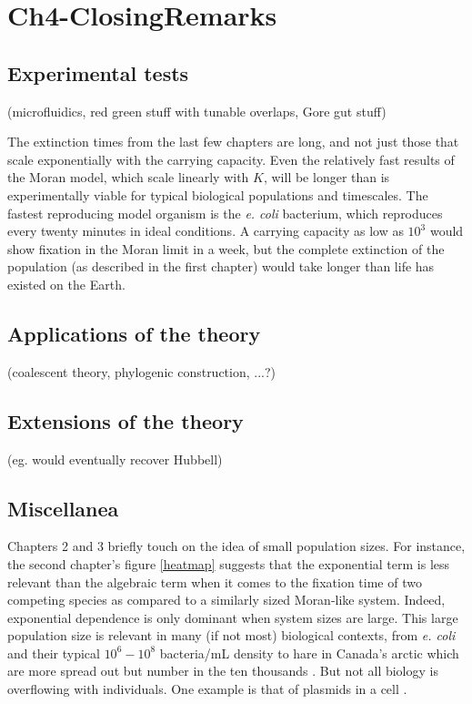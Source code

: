 \chapter{Ch4-ClosingRemarks}

\section{Experimental tests}
 (microfluidics, red green stuff with tunable overlaps, Gore gut stuff)

The extinction times from the last few chapters are long, and not just those that scale exponentially with the carrying capacity. 
Even the relatively fast results of the Moran model, which scale linearly with $K$, will be longer than is experimentally viable for typical biological populations and timescales. 
The fastest reproducing model organism is the \emph{e. coli} bacterium, which reproduces every twenty minutes in ideal conditions. 
A carrying capacity as low as $10^3$ would show fixation in the Moran limit in a week, but the complete extinction of the population (as described in the first chapter) would take longer than life has existed on the Earth. %



\section{Applications of the theory}
 (coalescent theory, phylogenic construction, ...?)


\section{Extensions of the theory}
 (eg. would eventually recover Hubbell)


\section{Miscellanea}
Chapters 2 and 3 briefly touch on the idea of small population sizes. 
For instance, the second chapter's figure \ref{heatmap} suggests that the exponential term is less relevant than the algebraic term when it comes to the fixation time of two competing species as compared to a similarly sized Moran-like system. 
Indeed, exponential dependence is only dominant when system sizes are large. 
This large population size is relevant in many (if not most) biological contexts, from \emph{e. coli} and their typical $10^6 - 10^8$ bacteria/mL density \cite{Lenski} to hare in Canada's arctic which are more spread out but number in the ten thousands \cite{or whatever}. 
But not all biology is overflowing with individuals. 
One example is that of plasmids in a cell \cite{Ingalls}. 

